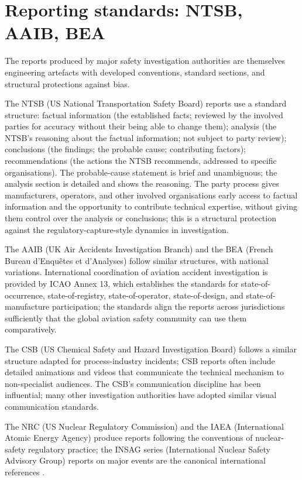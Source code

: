 \section{Reporting standards: NTSB, AAIB, BEA}

The reports produced by major safety investigation authorities are themselves engineering artefacts with developed conventions, standard sections, and structural protections against bias.

The NTSB (US National Transportation Safety Board) reports use a standard structure: factual information (the established facts; reviewed by the involved parties for accuracy without their being able to change them); analysis (the NTSB's reasoning about the factual information; not subject to party review); conclusions (the findings; the probable cause; contributing factors); recommendations (the actions the NTSB recommends, addressed to specific organisations). The probable-cause statement is brief and unambiguous; the analysis section is detailed and shows the reasoning. The party process gives manufacturers, operators, and other involved organisations early access to factual information and the opportunity to contribute technical expertise, without giving them control over the analysis or conclusions; this is a structural protection against the regulatory-capture-style dynamics in investigation.

The AAIB (UK Air Accidents Investigation Branch) and the BEA (French Bureau d'Enquêtes et d'Analyses) follow similar structures, with national variations. International coordination of aviation accident investigation is provided by ICAO Annex 13, which establishes the standards for state-of-occurrence, state-of-registry, state-of-operator, state-of-design, and state-of-manufacture participation; the standards align the reports across jurisdictions sufficiently that the global aviation safety community can use them comparatively.

The CSB (US Chemical Safety and Hazard Investigation Board) follows a similar structure adapted for process-industry incidents; CSB reports often include detailed animations and videos that communicate the technical mechanism to non-specialist audiences. The CSB's communication discipline has been influential; many other investigation authorities have adopted similar visual communication standards.

The NRC (US Nuclear Regulatory Commission) and the IAEA (International Atomic Energy Agency) produce reports following the conventions of nuclear-safety regulatory practice; the INSAG series (International Nuclear Safety Advisory Group) reports on major events are the canonical international references \cite{acc:iaea-insag1-1986,acc:iaea-insag7-1992}.

